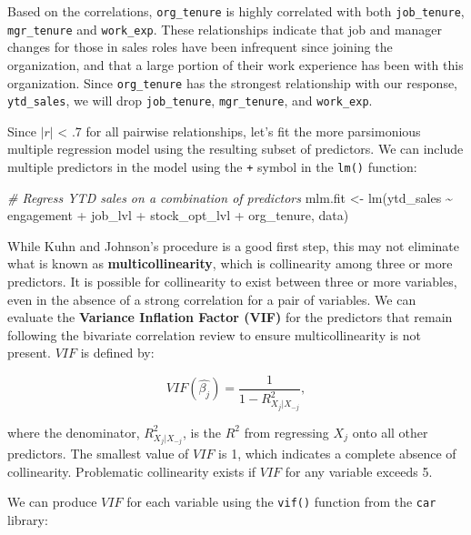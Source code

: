 \documentclass[
]{book}
\newenvironment{Shaded}{\begin{snugshade}}{\end{snugshade}}
\newcommand{\CommentTok}[1]{\textcolor[rgb]{0.56,0.35,0.01}{\textit{#1}}}
\newcommand{\FunctionTok}[1]{\textcolor[rgb]{0.00,0.00,0.00}{#1}}
\newcommand{\NormalTok}[1]{#1}
\newcommand{\OtherTok}[1]{\textcolor[rgb]{0.56,0.35,0.01}{#1}}
\newcommand{\SpecialCharTok}[1]{\textcolor[rgb]{0.00,0.00,0.00}{#1}}
\begin{document}
Based on the correlations, \texttt{org\_tenure} is highly correlated with both \texttt{job\_tenure}, \texttt{mgr\_tenure} and \texttt{work\_exp}. These relationships indicate that job and manager changes for those in sales roles have been infrequent since joining the organization, and that a large portion of their work experience has been with this organization. Since \texttt{org\_tenure} has the strongest relationship with our response, \texttt{ytd\_sales}, we will drop \texttt{job\_tenure}, \texttt{mgr\_tenure}, and \texttt{work\_exp}.

Since \(|r|\) \textless{} .7 for all pairwise relationships, let's fit the more parsimonious multiple regression model using the resulting subset of predictors. We can include multiple predictors in the model using the \texttt{+} symbol in the \texttt{lm()} function:

\begin{Shaded}
\begin{Highlighting}[]
\CommentTok{\# Regress YTD sales on a combination of predictors}
\NormalTok{mlm.fit }\OtherTok{\textless{}{-}} \FunctionTok{lm}\NormalTok{(ytd\_sales }\SpecialCharTok{\textasciitilde{}}\NormalTok{ engagement }\SpecialCharTok{+}\NormalTok{ job\_lvl }\SpecialCharTok{+}\NormalTok{ stock\_opt\_lvl }\SpecialCharTok{+}\NormalTok{ org\_tenure, data)}
\end{Highlighting}
\end{Shaded}

While Kuhn and Johnson's procedure is a good first step, this may not eliminate what is known as \textbf{multicollinearity}, which is collinearity among three or more predictors. It is possible for collinearity to exist between three or more variables, even in the absence of a strong correlation for a pair of variables. We can evaluate the \textbf{Variance Inflation Factor (VIF)} for the predictors that remain following the bivariate correlation review to ensure multicollinearity is not present. \(VIF\) is defined by:

\[ VIF(\hat{\beta_j}) = \frac{1}{1 - R^2_{X_j|X_{-j}}}, \]

where the denominator, \(R^2_{X_j|X_{-j}}\), is the \(R^2\) from regressing \(X_j\) onto all other predictors. The smallest value of \(VIF\) is 1, which indicates a complete absence of collinearity. Problematic collinearity exists if \(VIF\) for any variable exceeds 5.

We can produce \(VIF\) for each variable using the \texttt{vif()} function from the \texttt{car} library:
\end{document}
